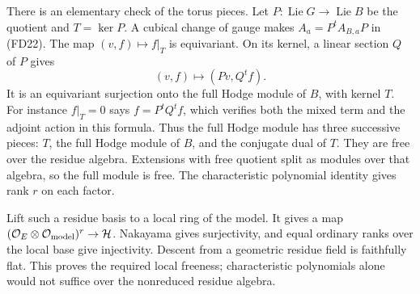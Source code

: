 There is an elementary check of the torus pieces.
Let \(P:\operatorname{Lie}G\to\operatorname{Lie}B\) be the
quotient and \(T=\ker P\).
A cubical change of gauge makes
\(A_a=P^tA_{B,a}P\) in (FD22).
The map \((v,f)\mapsto f|_T\) is equivariant.
On its kernel, a linear section \(Q\) of \(P\) gives
\[
                         (v,f)\longmapsto(Pv,Q^tf).
\]
It is an equivariant surjection onto the full Hodge module
of \(B\), with kernel \(T\).
For instance \(f|_T=0\) says \(f=P^tQ^tf\), which verifies
both the mixed term and the adjoint action in this formula.
Thus the full Hodge module has three successive pieces:
\(T\), the full Hodge module of \(B\), and the conjugate
dual of \(T\).
They are free over the residue algebra.
Extensions with free quotient split as modules over that
algebra, so the full module is free.
The characteristic polynomial identity gives rank \(r\)
on each factor.

Lift such a residue basis to a local ring of the model.
It gives a map
\((\mathcal O_E\otimes\mathcal O_{\rm model})^r\to\mathcal H\).
Nakayama gives surjectivity, and equal ordinary ranks over
the local base give injectivity.
Descent from a geometric residue field is faithfully flat.
This proves the required local freeness; characteristic
polynomials alone would not suffice over the nonreduced
residue algebra.

